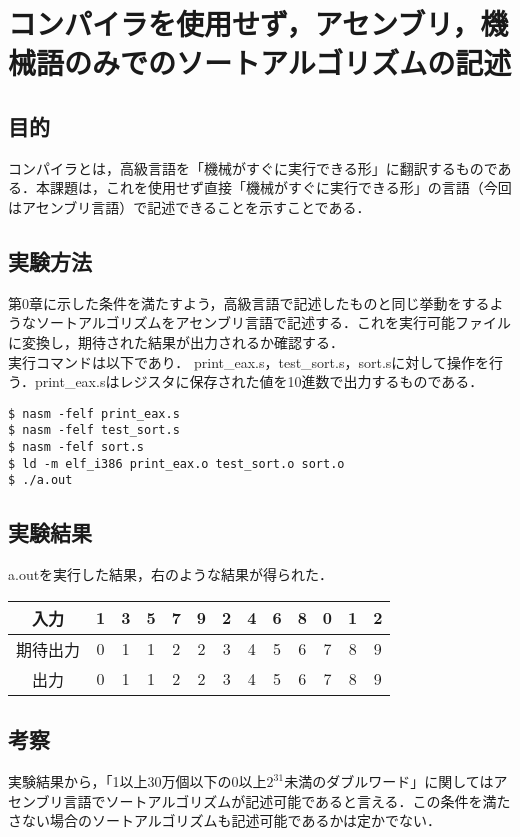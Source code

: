 \chapter{コンパイラを使用せず，アセンブリ，機械語のみでのソートアルゴリズムの記述}
\vspace{-1cm}
\section{目的}
コンパイラとは，高級言語を「機械がすぐに実行できる形」に翻訳するものである．本課題は，これを使用せず直接「機械がすぐに実行できる形」の言語（今回はアセンブリ言語）で記述できることを示すことである．

\section{実験方法}
第0章に示した条件を満たすよう，高級言語で記述したものと同じ挙動をするようなソートアルゴリズムをアセンブリ言語で記述する．これを実行可能ファイルに変換し，期待された結果が出力されるか確認する．\\
実行コマンドは以下であり．
print\_eax.s，test\_sort.s，sort.sに対して操作を行う．print\_eax.sはレジスタに保存された値を10進数で出力するものである．
\begin{lstlisting}[numbers={none}, caption={実行コマンド}, label={fig:実行コマンド}]
$ nasm -felf print_eax.s
$ nasm -felf test_sort.s
$ nasm -felf sort.s
$ ld -m elf_i386 print_eax.o test_sort.o sort.o
$ ./a.out
\end{lstlisting}

\section{実験結果}
\begin{table}[h]
  \centering
   \begin{minipage}{0.45\textwidth}
     a.outを実行した結果，右のような結果が得られた．\\
   \end{minipage}
   \hfill
   \begin{minipage}{0.45\textwidth}
     \centering
     \begin{tabular}{c|cccccccccccc}
       入力 & 1 & 3 & 5 & 7 & 9 & 2 & 4 & 6 & 8 & 0 & 1 & 2\\\hline
       期待出力 & 0 & 1 & 1 & 2 & 2 & 3 & 4 & 5 & 6 & 7 & 8 & 9\\
       出力 & 0 & 1 & 1 & 2 & 2 & 3 & 4 & 5 & 6 & 7 & 8 & 9\\
     \end{tabular}
   \end{minipage}
\end{table}
\vspace{-0.5cm}
\section{考察}
実験結果から，「1以上30万個以下の0以上$2^{31}$未満のダブルワード」に関してはアセンブリ言語でソートアルゴリズムが記述可能であると言える．この条件を満たさない場合のソートアルゴリズムも記述可能であるかは定かでない．
